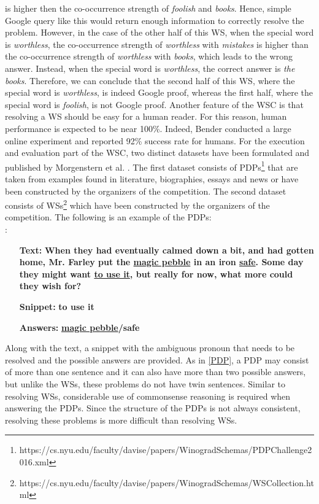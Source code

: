 is higher then the co-occurrence strength of \textit{foolish} and \textit{books}. Hence, simple Google query like this would return enough information to correctly resolve the problem.
However, in the case of the other half of this WS, when the special word is \textit{worthless}, the co-occurrence strength of \textit{worthless} with \textit{mistakes} is higher than the co-occurrence strength of \textit{worthless} with \textit{books}, which leads to the wrong answer. Instead, when the special word is \textit{worthless}, the correct answer is \textit{the books}.
Therefore, we can conclude that the second half of this WS, where the special word is \textit{worthless}, is indeed Google proof, whereas the first half, where the special word is \textit{foolish}, is not Google proof.
Another feature of the WSC is that resolving a WS should be easy for a human reader. For this reason, human performance is expected to be near 100\%. Indeed, Bender \cite{DBLP:conf/maics/Bender15} conducted a large online experiment and reported 92\% success rate for humans.
For the execution and evaluation part of the WSC, two distinct datasets have been formulated and published by Morgenstern et al. \cite{DBLP:journals/aim/MorgensternDO16}.
The first dataset consists of PDPs\footnote{https://cs.nyu.edu/faculty/davise/papers/WinogradSchemas/PDPChallenge2016.xml} that are taken from examples found in literature, biographies, essays and news or have been constructed by the organizers of the competition.
The second dataset consists of WSs\footnote{https://cs.nyu.edu/faculty/davise/papers/WinogradSchemas/WSCollection.html} which have been constructed by the organizers of the competition.
The following is an example of the PDPs:\\
:

\begin{itemize}[align=left]
	\item [\textbf{Text:}] \textbf{When they had eventually calmed down a bit, and had gotten home, Mr. Farley put the \underline{magic pebble} in an iron \underline{safe}. Some day they might want \underline{to use it}, but really for now, what more could they wish for?}

	\item [\textbf{Snippet:}] \textbf{to use it}
	\item [\textbf{Answers:}] \textbf{\underline{magic pebble}/safe}

\end{itemize}

Along with the text, a snippet with the ambiguous pronoun that needs to be resolved and the possible answers are provided. As in \ref{PDP}, a PDP may consist of more than one sentence and it can also have more than two possible answers, but unlike the WSs, these problems do not have twin sentences. Similar to resolving WSs, considerable use of commonsense reasoning is required when answering the PDPs. Since the structure of the PDPs is not always consistent, resolving these problems is more difficult than resolving WSs.

